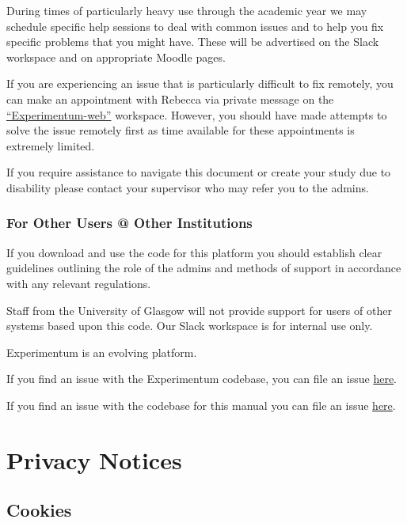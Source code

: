 \documentclass[]{book}
\begin{document}
During times of particularly heavy use through the academic year we may
schedule specific help sessions to deal with common issues and to help
you fix specific problems that you might have. These will be advertised
on the Slack workspace and on appropriate Moodle pages.

If you are experiencing an issue that is particularly difficult to fix
remotely, you can make an appointment with Rebecca via private message
on the \href{https://experimentum-web.slack.com/}{``Experimentum-web''}
workspace. However, you should have made attempts to solve the issue
remotely first as time available for these appointments is extremely
limited.

If you require assistance to navigate this document or create your study
due to disability please contact your supervisor who may refer you to
the admins.

\subsubsection*{For Other Users @ Other
Institutions}\label{for-other-users-other-institutions}

If you download and use the code for this platform you should establish
clear guidelines outlining the role of the admins and methods of support
in accordance with any relevant regulations.

Staff from the University of Glasgow will not provide support for users
of other systems based upon this code. Our Slack workspace is for
internal use only.

\begin{rainbow}
Experimentum is an evolving platform.

If you find an issue with the Experimentum codebase, you can file an
issue \href{https://github.com/debruine/experimentum/issues}{here}.

If you find an issue with the codebase for this manual you can file an
issue \href{https://github.com/RebeccaJLai/exp_manual/issues}{here}.
\end{rainbow}

\section*{Privacy Notices}\label{privacy-notices}

\subsection*{Cookies}\label{cookies}
\end{document}
